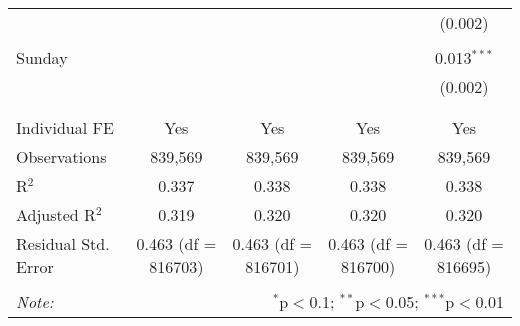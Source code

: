 \documentclass[
]{article}
\begin{document}
\begin{table}[!htbp]
{\begin{tabular}{@{\extracolsep{5pt}}lcccc}
  &  &  &  & (0.002) \\ 
  & & & & \\ 
 Sunday &  &  &  & 0.013$^{***}$ \\ 
  &  &  &  & (0.002) \\ 
  & & & & \\ 
\hline \\[-1.8ex] 
Individual FE & Yes & Yes & Yes & Yes \\ 
Observations & 839,569 & 839,569 & 839,569 & 839,569 \\ 
R$^{2}$ & 0.337 & 0.338 & 0.338 & 0.338 \\ 
Adjusted R$^{2}$ & 0.319 & 0.320 & 0.320 & 0.320 \\ 
Residual Std. Error & 0.463 (df = 816703) & 0.463 (df = 816701) & 0.463 (df = 816700) & 0.463 (df = 816695) \\ 
\hline 
\hline \\[-1.8ex] 
\textit{Note:}  & \multicolumn{4}{r}{$^{*}$p$<$0.1; $^{**}$p$<$0.05; $^{***}$p$<$0.01} \\ 
\end{tabular}
} 
\end{table} 
\newpage
\end{document}
